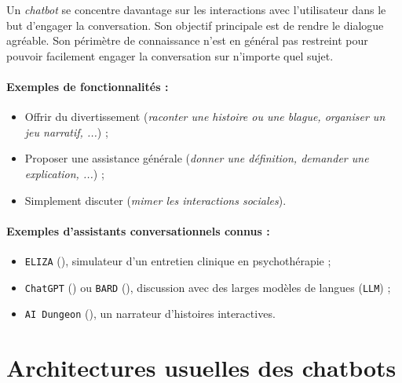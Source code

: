 			Un \textit{chatbot}  se concentre davantage sur les interactions avec l'utilisateur dans le but d'engager la conversation.
			Son objectif principale est de rendre le dialogue agréable.
			Son périmètre de connaissance n'est en général pas restreint pour pouvoir facilement engager la conversation sur n'importe quel sujet.
	
		\paragraph{Exemples de fonctionnalités :}
		
			\begin{itemize}
				\item Offrir du divertissement (\textit{raconter une histoire ou une blague, organiser un jeu narratif, ...}) ;
				\item Proposer une assistance générale (\textit{donner une définition, demander une explication, ...}) ;
				\item Simplement discuter (\textit{mimer les interactions sociales}).
			\end{itemize}
		
		\paragraph{Exemples d'assistants conversationnels connus :}
		
			\begin{itemize}
				\item \texttt{ELIZA} (\cite{weizenbaum:1966:eliza-computer-program}), simulateur d'un entretien clinique en psychothérapie ;
				\item \texttt{ChatGPT} (\cite{openai:2023:chatgpt}) ou \texttt{BARD} (\cite{google:2023:bard-chat-based}), discussion avec des larges modèles de langues (\texttt{LLM}) ;
				\item \texttt{AI Dungeon} (\cite{latitude-inc.-oasis-tech-inc.:2019:ai-dungeon}), un narrateur d'histoires interactives.
			\end{itemize}


\section{Architectures usuelles des chatbots}
\label{annex:B.2-CHATBOT-ARCHITECTURES}

